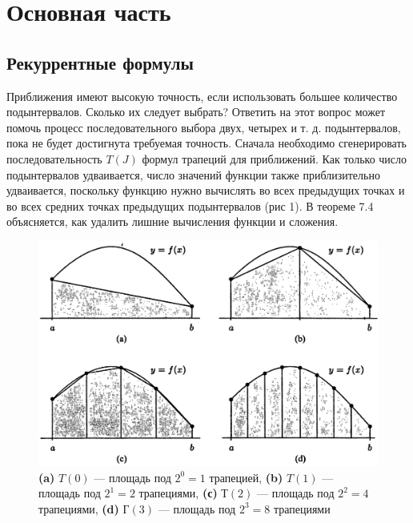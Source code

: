 \documentclass[14pt, titlepage, a4paper]{extarticle} %
\begin{document}
	
	\pagebreak
	
	
	\section*{Основная часть}
	
	\subsection*{Рекуррентные формулы}
	
	Приближения имеют высокую точность, если использовать большее количество подынтервалов. Сколько их следует выбрать? Ответить на этот вопрос может помочь процесс последовательного
	выбора двух, четырех и т. д. подынтервалов, пока не будет достигнута требуемая точность. Сначала необходимо сгенерировать последовательность {$T(J)$} формул трапеций для приближений. Как только число подынтервалов удваивается, число значений функции также приблизительно удваивается, поскольку функцию нужно вычислять во всех предыдущих точках и во всех средних точках предыдущих подынтервалов (рис 1). В теореме 7.4 объясняется, как удалить лишние вычисления функции и сложения.
	
	\begin{figure}[h]
		\centering
		\includegraphics[width=400pt]{pic1.png}
		\caption{\textbf{(a)} $T(0)$ — площадь под $2^0 = 1$ трапецией, \textbf{(b)} $T(1)$ — площадь под		$2^1 = 2$ трапециями, \textbf{(с)} $Т(2)$ — площадь под $2^2 = 4$ трапециями, \textbf{(d)} $Г(3)$ — площадь под $2^3 = 8$ трапециями}
	\end{figure}
	
\end{document}
